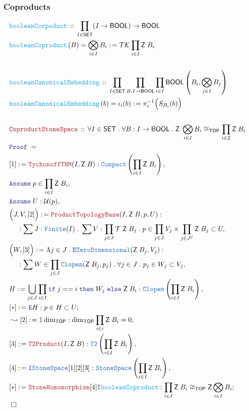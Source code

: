 \documentclass[12pt]{scrartcl}
\newcommand{\TYPE}[1]{\textcolor{NavyBlue}{\mathtt{#1}}}
\newcommand{\FUNC}[1]{\textcolor{Cerulean}{\mathtt{#1}}}
\newcommand{\LOGIC}[1]{\textcolor{Blue}{\mathtt{#1}}}
\newcommand{\THM}[1]{\textcolor{Maroon}{\mathtt{#1}}}
\renewcommand{\.}{\; . \;}
\newcommand{\de}{: \kern 0.1pc =}
\newcommand{\If}{\LOGIC{if} \;}
\newcommand{\Then}{ \; \LOGIC{then} \;}
\newcommand{\Else}{\; \LOGIC{else} \;}
\newcommand{\Act}[1]{\left( #1 \right)}
\newcommand{\Theorem}[2]{& \THM{#1} \, :: \, #2 \\ & \Proof = \\ }
\newcommand{\DeclareFunc}[2]{& \FUNC{#1} \, :: \, #2 \\}
\newcommand{\DefineNamedFunc}[4]{&  \FUNC{#1}\Act{#2} = #3 \de #4 \\}
\newcommand{\NewLine}{\\ & \kern 1pc}
\newcommand{\Page}[1]{ \begin{align*} #1 \end{align*}   }
\newcommand{\Intro}{\LOGIC{I}}
\newcommand{\Elim}{\LOGIC{E}}
\newcommand{\Say}[3]{& #1 \de #2 : #3, \\}
\newcommand{\Conclude}[3]{& #1 \de #2 : #3; \\}
\newcommand{\Derive}[3]{& \leadsto #1 \de #2 : #3, \\}
\newcommand{\Assume}[2]{& \LOGIC{Assume} \; #1 : #2, \\}
\newcommand{\AssumeIn}[2]{& \LOGIC{Assume} \; #1 \in #2, \\}
\newcommand{\QED}{\; \square}
\newcommand{\EndProof}{& \QED \\}
\newcommand{\Proof}{\LOGIC{Proof} \; }
\newcommand{\C}{\mathcal{C}}
\newcommand{\I}{\mathcal{I}}
\newcommand{\SET}{\mathsf{SET}}
\newcommand{\Compact}{\TYPE{Compact}}
\newcommand{\Clopen}{\TYPE{Clopen}}
\newcommand{\TOP}{\mathsf{TOP}}
\newcommand{\T}{\mathcal{T}}
\newcommand{\U}{\mathcal{U}}
\newcommand{\TK}{\mathcal{TK}}
\newcommand{\BOOL}{\mathsf{BOOL}}
\newcommand{\Z}{\mathsf{Z}}
\begin{document}
\subsubsection{Coproducts}
\Page{
	\DeclareFunc{booleanCorpoduct}
	{
		\prod_{I \in \SET} ( I \to \BOOL ) \to \BOOL
	}
	\DefineNamedFunc{booleanCoproduct}{B}{\bigotimes_{i \in I} B_i}
	{
		\TK \prod_{i \in I} \Z \; B_i
	}
	\\
	\DeclareFunc{booleanCanonicalEmbedding}
	{
		\prod_{I \in \SET} 
		\prod_{B : I \to \BOOL}  
		\prod_{i \in I}  
		\BOOL\left(B_i , \bigotimes_{j \in I} B_j \right) 
	}
	\DefineNamedFunc{booleanCanonicalEmbedding}{b}{\iota_i(b)}
	{
		\pi_i^{-1}\Big( S_{B_i}(b) \Big)
	}
	\\
	\Theorem{CoproductStoneSpace}
	{
		\forall I \in \SET \.
		\forall B : I \to \BOOL \.
		\Z \; \bigotimes_{i \in I} B_i  \cong_\TOP \prod_{i \in \I} \Z\;B_i
	}
	\Say{[1]}{\THM{TychonoffTHM}(I,\Z\;B)}
	{
		\Compact\left(\prod_{i \in I} \Z\;B_i\right)
	}
	\AssumeIn{p}{\prod_{i \in I} \Z \; B_i}
	\Assume{U}{\U(p)}
	\Say{\Big(J,V,[2]\Big)}{\THM{ProductTopologyBase}(I,\Z\;B,p,U)}
	{
		\NewLine :		
		\sum J : \TYPE{Finite}(I) \.
		\sum V : \prod_{j \in J} \T \; \Z \; B_j \.
		p \in \prod_{j \in J} V_j \times \prod_{j \in J^\C} \Z\;B_j \subset U 
	}
	\Say{\Big(W,[3]\Big)}{\Lambda j \in J \. \Elim \TYPE{ZeroDimensional}(\Z\;B_j,V_j)}
	{
		\NewLine :		
		\sum W \in \prod_{j\in J} \Clopen(\Z\;B_j,p_j) \.
		\forall j \in J \. p_j \in W_j \subset V_j
	}
	\Say{H}{\bigcup_{j \in J} \prod_{i \in I} \If j == i \Then W_j \Else \Z\;B_i}
	{
		\Clopen\left( \prod_{i \in I} \Z \; B_i\right)
	}
	\Conclude{[*]}{\Elim H}{ p \in H \subset U }
	\Derive{[2]}{\Intro \dim_\TOP}{ \dim_\TOP \prod_{i \in i} \Z \; B_i = 0}
	\Say{[3]}{\THM{T2Product}(I,\Z\;B)}
	{
		\TYPE{T2}\left( \prod_{i \in I} \Z\;B_i \right)	
	}
	\Say{[4]}{\Intro \TYPE{StoneSpace}[1][2][3]}
	{
		\TYPE{StoneSpace}\left( \prod_{i \in I} \Z\;B_i \right)
	}	
	\Conclude{[*]}{\THM{StoneHomomorphism}[4]\Intro \FUNC{booleanCoproduct}}
	{
		 \prod_{i \in I} \Z\;B_i \cong_\TOP  \Z \bigotimes_{i \in I} B_i
	}
	\EndProof
}
\end{document}
